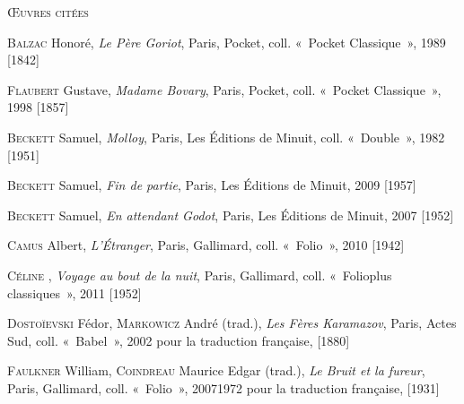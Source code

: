 \documentclass[12pt, a4paper]{article}
\begin{document}
		
	
		\vspace*{2cm}
		\setlength{\parindent}{0cm}
{\large\textsc{Œuvres citées}}
		\vspace*{1cm}
		\setlength{\parindent}{25pt}
		
		
		
		
		\textsc{Balzac} Honoré, \textit{Le Père Goriot}, Paris, Pocket, coll. «~Pocket Classique~», 1989 [1842]\par 
		 
		
	
		\textsc{Flaubert} Gustave, \textit{Madame Bovary}, Paris, Pocket, coll. «~Pocket Classique~», 1998 [1857]\par 
		 
		
	
		\textsc{Beckett} Samuel, \textit{Molloy}, Paris, Les Éditions de Minuit, coll. «~Double~», 1982 [1951]\par 
		 
		
	
		\textsc{Beckett} Samuel, \textit{Fin de partie}, Paris, Les Éditions de Minuit, 2009 [1957]\par 
		 
		
	
		\textsc{Beckett} Samuel, \textit{En attendant Godot}, Paris, Les Éditions de Minuit, 2007 [1952]\par 
		 
		
	
		\textsc{Camus} Albert, \textit{L'Étranger}, Paris, Gallimard, coll. «~Folio~», 2010 [1942]\par 
		 
		
	
		\textsc{Céline} , \textit{Voyage au bout de la nuit}, Paris, Gallimard, coll. «~Folioplus classiques~», 2011 [1952]\par 
		 
		
	
		\textsc{Dostoïevski} Fédor, \textsc{Markowicz} André (trad.), \textit{Les Fères Karamazov}, Paris, Actes Sud, coll. «~Babel~», 2002 pour la traduction française,  [1880]\par 
		 
		
	
		\textsc{Faulkner} William, \textsc{Coindreau} Maurice Edgar (trad.), \textit{Le Bruit et la fureur}, Paris, Gallimard, coll. «~Folio~», 20071972 pour la traduction française,  [1931]\par 
		 
		
	
\end{document}
